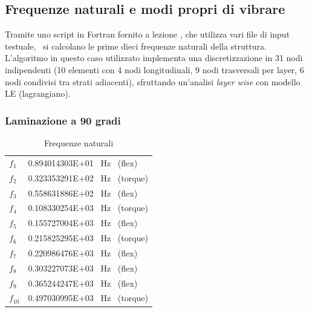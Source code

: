 \documentclass{article}
\begin{document}
            \clearpage

            \subsection{Frequenze naturali e modi propri di vibrare \label{Esercitazione3_freq_nat}}

            Tramite uno script in Fortran fornito a lezione \autocite{MUL2}, che utilizza vari file di input testuale, \
            si calcolano le prime dieci frequenze naturali della struttura. \\ 

            L'algoritmo in questo caso utilizzato implementa una discretizzazione in 31 nodi indipendenti (10 elementi con 4 nodi longitudinali, 9 nodi trasversali per layer, 
            6 nodi condivisi tra strati adiacenti), sfruttando un'analisi \textit{layer wise} con modello LE (lagrangiano).

            \subsubsection{Laminazione a 90 gradi \label{Esercitazione3_freq_nat_90}}

                \begin{table}[h!]
                    \centering
                    \begin{tabular}{@{}ll@{}}
                    \toprule
                    $f_1$    & 0.894014303E+01  \ Hz \ (flex) \\
                    $f_2$    & 0.323353291E+02  \ Hz \ (torque) \\
                    $f_3$    & 0.558631886E+02  \ Hz \ (flex) \\
                    $f_4$    & 0.108330254E+03  \ Hz \ (torque) \\
                    $f_5$    & 0.155727004E+03  \ Hz \ (flex) \\
                    $f_6$    & 0.215825295E+03  \ Hz \ (torque) \\
                    $f_7$    & 0.220986476E+03  \ Hz \ (flex) \\
                    $f_8$    & 0.303227073E+03  \ Hz \ (flex) \\
                    $f_9$    & 0.365244247E+03  \ Hz \ (flex) \\
                    $f_{10}$ & 0.497030995E+03  \ Hz \ (torque) \\ \bottomrule
                \end{tabular}
                \caption{Frequenze naturali}
                \label{tab:freq_nat}
                \end{table}
            
\end{document}
